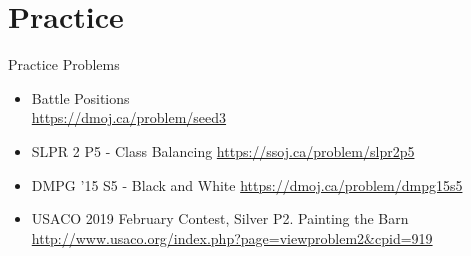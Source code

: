 \documentclass{beamer}
\begin{document}
\section{Practice}
\begin{frame}{Practice Problems}
\begin{itemize}
    \item Battle Positions \\ \url{https://dmoj.ca/problem/seed3}
    \item SLPR 2 P5 - Class Balancing \url{https://ssoj.ca/problem/slpr2p5}
    \item DMPG '15 S5 - Black and White  \url{https://dmoj.ca/problem/dmpg15s5}
    \item USACO 2019 February Contest, Silver P2. Painting the Barn \url{http://www.usaco.org/index.php?page=viewproblem2&cpid=919}
\end{itemize}


\end{frame}
\end{document}
